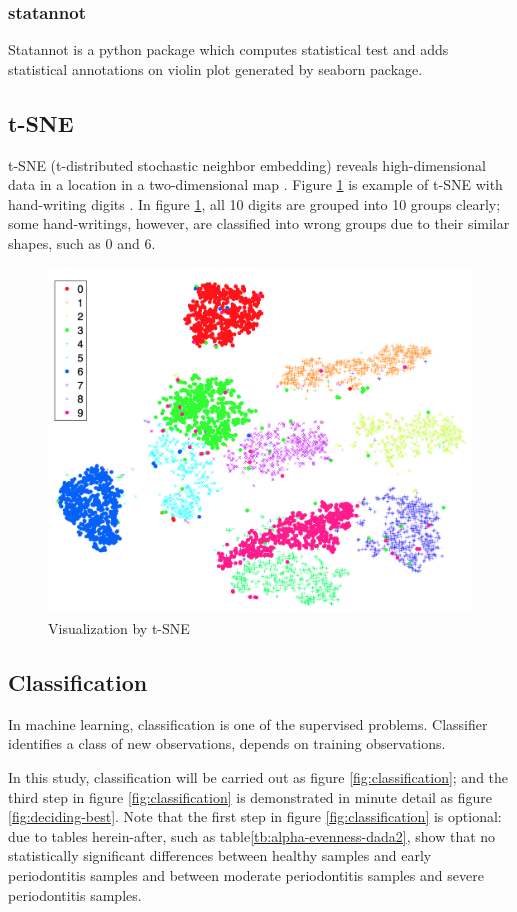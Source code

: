 \documentclass[a4paper]{article}
\begin{document}
            \subsubsection{statannot}
                Statannot is a python package which computes statistical test and adds statistical annotations on violin plot generated by seaborn package.

        \subsection{t-SNE}
            t-SNE (t-distributed stochastic neighbor embedding) reveals high-dimensional data in a location in a two-dimensional map \cite{tSNE1}. Figure \ref{fig:tsne-example} is example of t-SNE with hand-writing digits \cite{tSNE1}. In figure \ref{fig:tsne-example}, all 10 digits are grouped into 10 groups clearly; some hand-writings, however, are classified into wrong groups due to their similar shapes, such as 0 and 6.

            \begin{figure}[p]
                \centering
                \includegraphics[width=0.4 \linewidth]{figures/tSNE.png}
                \caption{Visualization by t-SNE \protect\cite{tSNE1}}
                \label{fig:tsne-example}
            \end{figure}

        \subsection{Classification}
            In machine learning, classification is one of the supervised problems. Classifier identifies a class of new observations, depends on training observations.

            In this study, classification will be carried out as figure \ref{fig:classification}; and the third step in figure \ref{fig:classification} is demonstrated in minute detail as figure \ref{fig:deciding-best}. Note that the first step in figure \ref{fig:classification} is optional: due to tables herein-after, such as table\ref{tb:alpha-evenness-dada2}, show that no statistically significant differences between healthy samples and early periodontitis samples and between moderate periodontitis samples and severe periodontitis samples.
\end{document}
